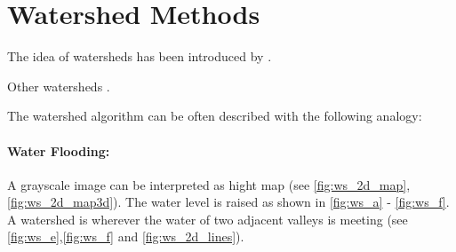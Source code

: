 \section{Watershed Methods}\label{sec:rw_watershed_methods}



The idea of watersheds has been introduced by \citet{beucher_1979_workshop}.

Other watersheds \citep{vinent_1991_pami,najman_1994_sp,roerdink_2000_finf,bertrand_2005_jmiv,cousty_2009_pami}.


The watershed algorithm can be often described with the following analogy:

\paragraph{Water Flooding:} A grayscale  image can be interpreted as hight map (see \cref{fig:ws_2d_map}, \cref{fig:ws_2d_map3d}).
The water level is raised as shown in \cref{fig:ws_a} - \cref{fig:ws_f}.
A watershed is wherever the water of two adjacent valleys is meeting (see \cref{fig:ws_e},\cref{fig:ws_f} and \cref{fig:ws_2d_lines}).


